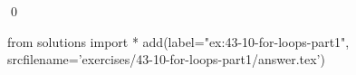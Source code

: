 
\begin{ex}
  \label{ex:43-10-for-loops-part1}
  
  \qed
\end{ex}
\begin{python0}
from solutions import *
add(label="ex:43-10-for-loops-part1",
    srcfilename='exercises/43-10-for-loops-part1/answer.tex')
\end{python0}
